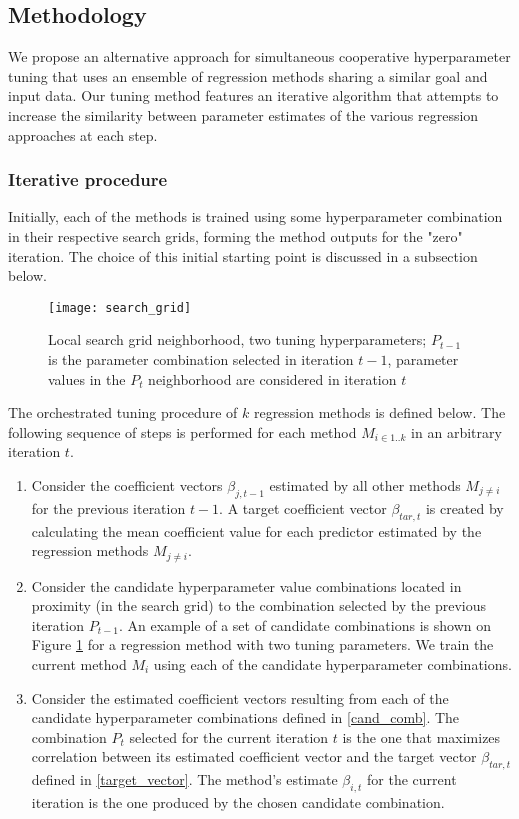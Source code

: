\subsection{Methodology} \label{sec:orc_meth}
We propose an alternative approach for simultaneous cooperative hyperparameter tuning that uses an ensemble of regression methods sharing a similar goal and input data. Our tuning method features an iterative algorithm that attempts to increase the similarity between parameter estimates of the various regression approaches at each step.

\subsubsection{Iterative procedure}
Initially, each of the methods is trained using some hyperparameter combination in their respective search grids, forming the method outputs for the "zero" iteration. The choice of this initial starting point is discussed in a subsection below.

\begin{figure}[H]
	\centering
	\texttt{[image: search\_grid]}
	\caption{Local search grid neighborhood, two tuning hyperparameters; $P_{t-1}$ is the parameter combination selected in iteration $t-1$, parameter values in the $P_t$ neighborhood are considered in iteration $t$}
	\label{fig:orc_tun_search_grid}
\end{figure}

The orchestrated tuning procedure of $k$ regression methods is defined below. The following sequence of steps is performed for each method $M_{i \in 1..k}$ in an arbitrary iteration $t$.
\begin{enumerate}
	\item \label{target_vector} Consider the coefficient vectors $\beta_{j, t-1}$ estimated by all other methods $M_{j \ne i}$ for the previous iteration $t-1$. A target coefficient vector $\beta_{tar, t}$ is created by calculating the mean coefficient value for each predictor estimated by the regression methods $M_{j \ne i}$.
	\item \label{cand_comb} Consider the candidate hyperparameter value combinations located in proximity (in the search grid) to the combination selected by the previous iteration $P_{t-1}$. An example of a set of candidate combinations is shown on Figure \ref{fig:orc_tun_search_grid} for a regression method with two tuning parameters. We train the current method $M_i$ using each of the candidate hyperparameter combinations.
	\item Consider the estimated coefficient vectors resulting from each of the candidate hyperparameter combinations defined in \ref{cand_comb}. The combination $P_t$ selected for the current iteration $t$ is the one that maximizes correlation between its estimated coefficient vector and the target vector $\beta_{tar, t}$ defined in \ref{target_vector}. The method's estimate $\beta_{i, t}$ for the current iteration is the one produced by the chosen candidate combination.
\end{enumerate}

